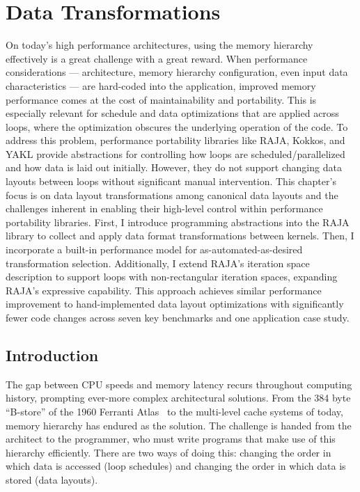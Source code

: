 
\chapter{Data Transformations}\label{chap:FormatDecisions}

On today's high performance architectures, using the memory hierarchy effectively is a great challenge with a great reward.
When performance considerations --- architecture, memory hierarchy configuration, even input data characteristics --- are hard-coded into the application, improved memory performance comes at the cost of maintainability and portability. 
This is especially relevant for schedule and data optimizations that are applied across loops, where the optimization obscures the underlying operation of the code.
To address this problem, performance portability libraries like RAJA, Kokkos, and YAKL provide abstractions for controlling how loops are scheduled/parallelized and how data is laid out initially.
However, they do not support changing data layouts between loops without significant manual intervention.
This chapter's focus is on data layout transformations among canonical data layouts and the challenges inherent in enabling their high-level control within performance portability libraries.
First, I introduce programming abstractions into the RAJA library to collect and apply data format transformations between kernels.
Then, I incorporate a built-in performance model for as-automated-as-desired transformation selection.
Additionally, I extend RAJA's iteration space description to support loops with non-rectangular iteration spaces, expanding RAJA's expressive capability.
This approach achieves similar performance improvement to hand-implemented data layout optimizations with significantly fewer code changes across seven key benchmarks and one application case study.

\section{Introduction}

The gap between CPU speeds and memory latency recurs throughout computing history, prompting ever-more complex architectural solutions.
From the 384 byte ``B-store'' of the 1960 Ferranti Atlas~\cite{ferranti1960features} to the multi-level cache systems of today, memory hierarchy has endured as the solution.
The challenge is handed from the architect to the programmer, who must write programs that make use of this hierarchy efficiently.
There are two ways of doing this: changing the order in which data is accessed (loop schedules) and changing the order in which data is stored (data layouts).

